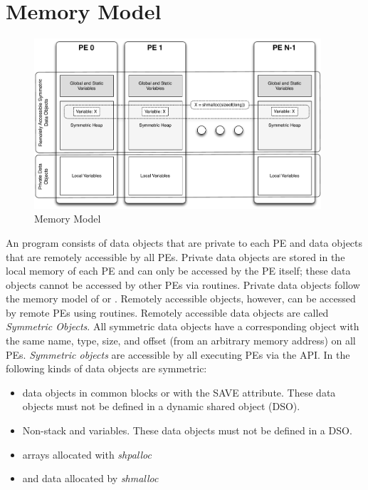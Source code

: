 \section{Memory Model}
\begin{figure}[h]
\includegraphics[width=0.95\textwidth]{diagrams/updated/mem_model}      
\caption{\OSH{} Memory Model}                                   
\label{fig:mem_model}                                               
\end{figure}      
An \openshmem program consists of data objects that are private to each \ac{PE} and data 
objects that are remotely accessible by all \ac{PE}s. Private data objects are stored in the local
memory of each \ac{PE} and can only be accessed by the \ac{PE} itself; these data objects
cannot be accessed by other \ac{PE}s via \openshmem routines. Private data objects
follow the memory model of \Clang{} or \Fortran{}. Remotely accessible
objects, however, can be accessed by remote \ac{PE}s using \openshmem routines.
Remotely accessible data objects are called \emph{Symmetric Objects}.
All symmetric data objects have a corresponding object with the same
name, type, size, and offset (from an arbitrary memory address) on all \ac{PE}s. \emph{Symmetric objects } are accessible by all executing \ac{PE}s via the \openshmem \ac{API}.  
In \openshmem{} the following kinds of data objects are symmetric:
\begin{itemize}
  \item \Fortran{} data objects in common blocks or with the  SAVE  attribute. These data objects must not be defined in a dynamic shared object (DSO).
  \item Non-stack \Clang{} and \Cpp{} variables.   These  data	objects must  not  be defined in a DSO.
  \item \Fortran{} arrays allocated with \textit{shpalloc} 
  \item \Clang{} and \Cpp{} data allocated by \textit{shmalloc}
\end{itemize}       

